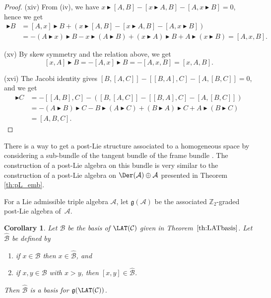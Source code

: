 \documentclass[pdftex]{sigma}
\numberwithin{equation}{section}
\newtheorem{Corollary}[Theorem]{Corollary}
\begin{document}
\begin{proof}
(xiv) From (iv), we have $x \blacktriangleright [A,B] - [x \blacktriangleright A,B] - [A, x\blacktriangleright B] = 0$, hence we get
 \begin{align*}
 [A,x] \blacktriangleright B & = [A, x] \blacktriangleright B + ( x \blacktriangleright [A,B] - [x \blacktriangleright A,B] - [A, x\blacktriangleright B] ) \\
 & = - (A \blacktriangleright x) \blacktriangleright B - x \blacktriangleright (A \blacktriangleright B) + (x \blacktriangleright A) \blacktriangleright B + A \blacktriangleright (x \blacktriangleright B )
 = [A,x,B].
 \end{align*}

(xv) By skew symmetry and the relation above, we get
 \[
 [x,A] \blacktriangleright B = -[A,x] \blacktriangleright B = -[A,x,B] = [x,A,B].
 \]

(xvi) The Jacobi identity gives $[B,[A,C]] - [[B,A],C] - [A,[B,C]]=0$, and we get
 \begin{align*}
 [A,B] \blacktriangleright C &{}= -[[A,B],C] - ( [B,[A,C]] - [[B,A],C] - [A,[B,C]] ) \\
 &{}= - (A\blacktriangleright B ) \blacktriangleright C - B \blacktriangleright ( A \blacktriangleright C) + (B \blacktriangleright A ) \blacktriangleright C + A \blacktriangleright (B \blacktriangleright C) \\
 &{}= [A,B,C].
\tag*{\qed}
\end{align*}
\renewcommand{\qed}{}
\end{proof}

\begin{Remark}
 There is a way to get a post-Lie structure associated to a homogeneous space by considering a sub-bundle of the tangent bundle of the frame bundle \cite{grong_MK_S_2023}. The construction of a post-Lie algebra on this bundle is very similar to the construction of a post-Lie algebra on $\Der(\mathcal{A}) \oplus \mathcal{A}$ presented in Theorem \ref{th:pL_emb}.
\end{Remark}

For a Lie admissible triple algebra $\mathcal{A}$, let $\mathfrak{g}(\mathcal{A})$ be the associated $\mathbb{Z}_2$-graded post-Lie algebra of~$\mathcal{A}$.

\begin{Corollary}
 Let $\mathcal{B}$ be the basis of $\LAT(\mathcal{C})$ given in Theorem~$\ref{th:LATbasis}$. Let $\hat{\mathcal{B}}$ be defined by
 \begin{enumerate}\itemsep=0pt
 \item[$(i)$] if $x\in \mathcal{B}$ then $x \in \hat{\mathcal{B}}$, and
 \item[$(ii)$] if $x,y \in \mathcal{B}$ with $x>y$, then $[x,y] \in \hat{\mathcal{B}}$.
 \end{enumerate}
 Then $\hat{\mathcal{B}}$ is a basis for $\mathfrak{g}(\LAT(\mathcal{C}))$.
\end{Corollary}
\end{document}
